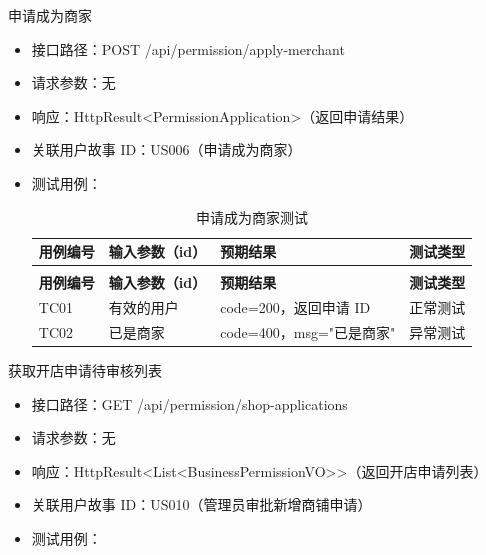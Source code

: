 \begin{levellist}
\begin{levellist}
        \item 申请成为商家
        \begin{itemize}
            \item 接口路径：POST /api/permission/apply-merchant
            \item 请求参数：无
            \item 响应：HttpResult<PermissionApplication>（返回申请结果）
            \item 关联用户故事 ID：US006（申请成为商家）
            \item 测试用例：
                  \begin{longtable}{>{\centering\arraybackslash}m{1.7cm} >{\centering\arraybackslash}m{3cm} >{\centering\arraybackslash}m{6.3cm} >{\centering\arraybackslash}m{2cm}}

                      \caption{申请成为商家测试} \label{tab:training}                                 \\

                      \toprule
                      \textbf{用例编号} & \textbf{输入参数（id）} & \textbf{预期结果}       & \textbf{测试类型} \\
                      \midrule
                      \endfirsthead

                      \multicolumn{4}{c}{{\tablename\ \thetable{} 续表}}                        \\
                      \toprule
                      \textbf{用例编号} & \textbf{输入参数（id）} & \textbf{预期结果}       & \textbf{测试类型} \\
                      \midrule
                      \endhead

                      \bottomrule
                      \endfoot

                      TC01          & 有效的用户             & code=200，返回申请 ID    & 正常测试          \\
                      TC02          & 已是商家              & code=400，msg="已是商家" & 异常测试          \\
                  \end{longtable}
        \end{itemize}

        \item 获取开店申请待审核列表
        \begin{itemize}
            \item 接口路径：GET /api/permission/shop-applications
            \item 请求参数：无
            \item 响应：HttpResult<List<BusinessPermissionVO>>（返回开店申请列表）
            \item 关联用户故事 ID：US010（管理员审批新增商铺申请）
            \item 测试用例：
                  \begin{longtable}{>{\centering\arraybackslash}m{2cm} >{\centering\arraybackslash}m{4cm} >{\centering\arraybackslash}m{5cm} >{\centering\arraybackslash}m{2cm}}


\end{longtable}
\end{itemize}
\end{levellist}
\end{levellist}
